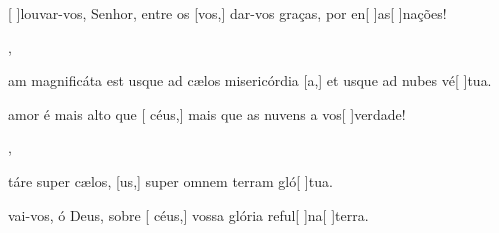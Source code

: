 {    {\item {}[ ]{lou}var-vos, Senhor, entre os [vos,] dar-vos graças, por en[ ]{as}[ ]{na}ções!},
  {\item {}am magnificáta est usque ad cælos misericórdia [a,] et usque ad nubes vé[ ]{tu}a.}%
    {\item {} amor é mais alto que [ céus,] mais que as nuvens a vos[ ]{ver}{da}de!},
  {\item {}táre super cælos, [us,] super omnem terram gló[ ]{tu}a.}%
    {\item {}vai-vos, ó Deus, sobre [ céus,] vossa glória reful[ ]{na}[ ]{ter}ra.}
}